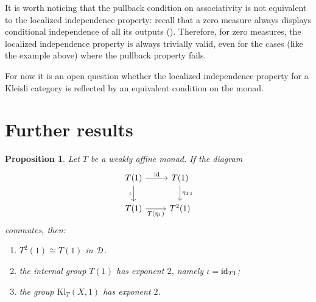 \documentclass[a4paper,UKenglish,numberwithinsect,cleveref, autoref, thm-restate]{lipics-v2021}
\theoremstyle{plain} %
\newtheorem{myproposition}[mytheorem]{Proposition}
\theoremstyle{definition} %
\begin{document}
It is worth noticing that the pullback condition on associativity is not equivalent to the localized independence property: recall that a zero measure always displays conditional independence of all its outputs ().
Therefore, for zero measures, the localized independence property is always trivially valid, even for the cases (like the example above) where the pullback property fails.

For now it is an open question whether the localized independence property for a Kleisli category is reflected by an equivalent condition on the monad.


\section{Further results}


\begin{myproposition}
Let $T$ be a weakly affine monad. If the diagram
\[\begin{tikzcd}
	{T(1)} & {T(1)} \\
	{T(1)} & {T^2(1)}
	\arrow["\iota"', from=1-1, to=2-1]
	\arrow["{T(\eta_1)}"', from=2-1, to=2-2]
	\arrow["\id",from=1-1, to=1-2]
	\arrow["{\eta_{T1}}", from=1-2, to=2-2]
\end{tikzcd}\]
commutes, then:
\begin{enumerate}
	\item $T^2(1)\cong T(1)$ in $\mathcal{D}$. 
	\item the internal group $T(1)$ has exponent $2$, namely $\iota=\operatorname{ id}_{T1}$;
	\item the group $\mathrm{Kl}_T(X,1)$ has exponent $2$.
\end{enumerate}
\end{myproposition}

 
\end{document}

